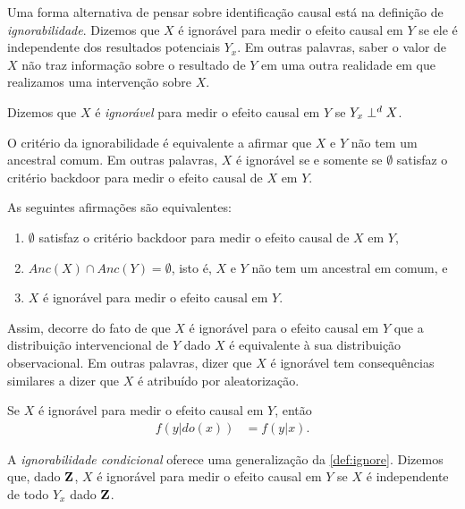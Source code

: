 Uma forma alternativa de pensar sobre
identificação causal está
na definição de \textit{ignorabilidade}.
Dizemos que $X$ é ignorável para
medir o efeito causal em $Y$ se
ele é independente dos resultados potenciais $Y_{x}$.
Em outras palavras, 
saber o valor de $X$ não traz informação sobre
o resultado de $Y$ em uma outra realidade em que
realizamos uma intervenção sobre $X$.

\begin{definition}[Ignorabilidade]
 \label{def:ignore}
 Dizemos que $X$ é \textit{ignorável} para
 medir o efeito causal em $Y$ se
 $Y_x \perp^d X$.
\end{definition}

O critério da ignorabilidade é equivalente a
afirmar que $X$ e $Y$ não tem um ancestral comum.
Em outras palavras, $X$ é ignorável se
e somente se $\emptyset$ satisfaz o critério backdoor para
medir o efeito causal de $X$ em $Y$.

\begin{lemma}
 \label{lemma:ignore_backdoor}
 As seguintes afirmações são equivalentes:
 \begin{enumerate}
  \item $\emptyset$ satisfaz o critério backdoor para
  medir o efeito causal de $X$ em $Y$,
  \item $Anc(X) \cap Anc(Y) = \emptyset$, isto é,
  $X$ e $Y$ não tem um ancestral em comum, e
  \item $X$ é ignorável para medir o efeito causal em $Y$.
 \end{enumerate}
\end{lemma}

Assim, decorre do fato de que $X$ é ignorável para 
o efeito causal em $Y$ que
a distribuição intervencional de $Y$ dado $X$ é
equivalente à sua distribuição observacional.
Em outras palavras, dizer que $X$ é ignorável tem
consequências similares a dizer que
$X$ é atribuído por aleatorização.

\begin{corollary}
 Se $X$ é ignorável para medir o efeito causal em $Y$, então
 \begin{align*}
  f(y|do(x)) &= f(y|x).
 \end{align*}
\end{corollary}

A \textit{ignorabilidade condicional} oferece
uma generalização da \cref{def:ignore}.
Dizemos que, dado ${\mathbf{Z}}$, 
$X$ é ignorável para medir o efeito causal em $Y$ se
$X$ é independente de todo $Y_x$ dado ${\mathbf{Z}}$.

